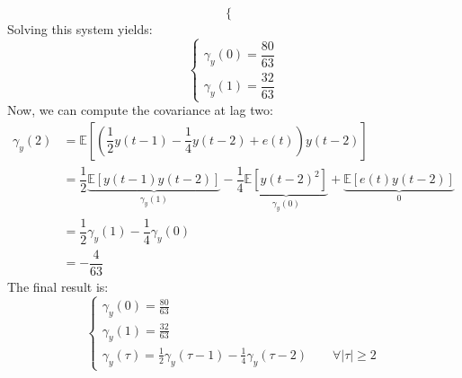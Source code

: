 \begin{enumerate}
\[\begin{cases}
        \end{cases}\]
        Solving this system yields:
        \[\begin{cases}
            \gamma_y(0)=\dfrac{80}{63} \\ 
            \gamma_y(1)=\dfrac{32}{63}
        \end{cases}\]
        Now, we can compute the covariance at lag two:
        \begin{align*}
            \gamma_y(2)     &= \mathbb{E}\left[\left(\dfrac{1}{2}y(t-1)-\dfrac{1}{4}y(t-2)+e(t)\right)y(t-2)\right] \\
                            &= \dfrac{1}{2}\underbrace{\mathbb{E}\left[y(t-1)y(t-2)\right]}_{\gamma_y(1)} -\dfrac{1}{4}\underbrace{\mathbb{E}\left[y(t-2)^2\right]}_{\gamma_y(0)} +\underbrace{\mathbb{E}\left[e(t)y(t-2)\right]}_0  \\
                            &= \dfrac{1}{2}\gamma_y(1) -\dfrac{1}{4}\gamma_y(0) \\
                            &= -\dfrac{4}{63}
        \end{align*}
        The final result is:
        \[\begin{cases}
            \gamma_y(0)=\frac{80}{63} \\
            \gamma_y(1)=\frac{32}{63} \\
            \gamma_y(\tau)=\frac{1}{2}\gamma_y(\tau-1)-\frac{1}{4}\gamma_y(\tau-2) \qquad \forall\left\lvert \tau\right\rvert \geq 2
        \end{cases}\]
\end{enumerate}